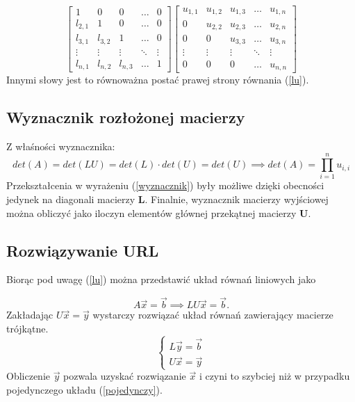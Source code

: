 \begin{equation}
\begin{bmatrix}
1 		& 0 	  & 0 	    & \dots  & 0 	\\  
l_{2,1} & 1 	  & 0 	    & \dots  & 0	 \\
l_{3,1} & l_{3,2} & 1 	    & \dots  & 0 	  \\
\vdots  & \vdots  & \vdots  & \ddots & \vdots \\
l_{n,1} & l_{n,2} & l_{n,3} & \dots  & 1 	 
\end{bmatrix}
\begin{bmatrix}
u_{1,1} & u_{1,2} & u_{1,3} & \dots & u_{1,n} \\
0 & u_{2,2} & u_{2,3} & \dots & u_{2,n} \\
0 & 0 & u_{3, 3} & \dots & u_{3, n} \\
\vdots & \vdots & \vdots & \ddots & \vdots \\
0 & 0 & 0 & \dots & u_{n,n}
\end{bmatrix}
\end{equation}
Innymi słowy jest to równoważna postać prawej strony równania (\ref{lu}).

\subsection{Wyznacznik rozłożonej macierzy}

Z właśności wyznacznika:
\begin{equation}
det(A) = det(LU) = det(L) \cdot det(U) = det(U) \implies det(A) = \prod_{i=1}^{n} u_{i,i}
\label{wyznacznik}
\end{equation}
Przekształcenia w wyrażeniu (\ref{wyznacznik}) były możliwe dzięki obecności jedynek na diagonali macierzy \textbf{L}. Finalnie, wyznacznik macierzy wyjściowej można obliczyć jako iloczyn elementów głównej przekątnej macierzy \textbf{U}. 

\subsection{Rozwiązywanie URL}
Biorąc pod uwagę (\ref{lu}) można przedstawić układ równań liniowych jako

\begin{equation}
A\vec{x} =\vec{b}
\implies
LU\vec{x} =\vec{b}.
\label{pojedynczy}
\end{equation}
Zakładając $ U\vec{x} =\vec{y} $ wystarczy rozwiązać układ równań zawierający macierze trójkątne.
\begin{equation}
\begin{cases}
L\vec{y} =\vec{b} \\
U\vec{x} =\vec{y}
\end{cases}
\end{equation}
Obliczenie $ \vec{y} $ pozwala uzyskać rozwiązanie $ \vec{x} $ i czyni to szybciej niż w przypadku pojedynczego układu (\ref{pojedynczy}).

